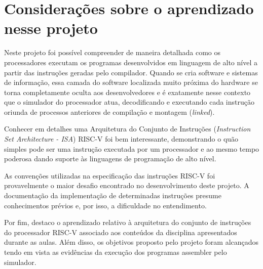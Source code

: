 
\section{Considerações sobre o aprendizado nesse projeto}

Neste projeto foi possível compreender de maneira detalhada como os processadores executam os programas desenvolvidos em linguagem de alto nível a partir das instruções geradas pelo compilador. Quando se cria software e sistemas de informação, essa camada do software localizada muito próxima do hardware se torna completamente oculta aos desenvolvedores e é exatamente nesse contexto que o simulador do processador atua, decodificando e executando cada instrução oriunda de processos anteriores de compilação e montagem (\textit{linked}).

Conhecer em detalhes uma Arquitetura do Conjunto de Instruções (\textit{Instruction Set Architecture - ISA}) RISC-V foi bem interessante, demonstrando o quão simples pode ser uma instrução executada por um processador e ao mesmo tempo poderosa dando suporte às linguagens de programação de alto nível.

As convenções utilizadas na especificação das instruções RISC-V foi provavelmente o maior desafio encontrado no desenvolvimento deste projeto. A documentação da implementação de determinadas instruções presume conhecimentos prévios e, por isso, a dificuldade no entendimento.

Por fim, destaco o aprendizado relativo à arquitetura do conjunto de instruções do processador RISC-V associado aos conteúdos da disciplina apresentados durante as aulas. Além disso, os objetivos proposto pelo projeto foram alcançados tendo em vista as evidências da execução dos programas assembler pelo simulador.  